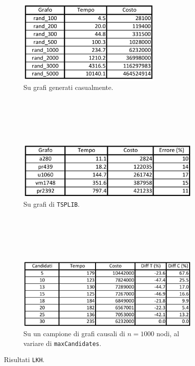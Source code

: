 \begin{figure}[H]
    \centering
    \begin{subfigure}{\linewidth}
        \centering
        \includegraphics[width=200pt]{img/LKHrandom.png}
        \caption*{Su grafi generati casualmente.}
    \end{subfigure}
    \ \\
    \ \\
    \ \\
    \ \\
    \begin{subfigure}{\linewidth}
        \centering
        \includegraphics[width=300pt]{img/LKHtsplib.png}
        \caption*{Su grafi di \texttt{TSPLIB}.}
    \end{subfigure}
    \ \\
    \ \\
    \ \\
    \ \\
    \begin{subfigure}{\linewidth}
        \centering
        \includegraphics[width=300pt]{img/LKHcandidati.png}
        \caption*{Su un campione di grafi causali di $n=1000$ nodi, al variare di \texttt{maxCandidates}.}
    \end{subfigure}
    \caption{Risultati \texttt{LKH}.}
\end{figure}

